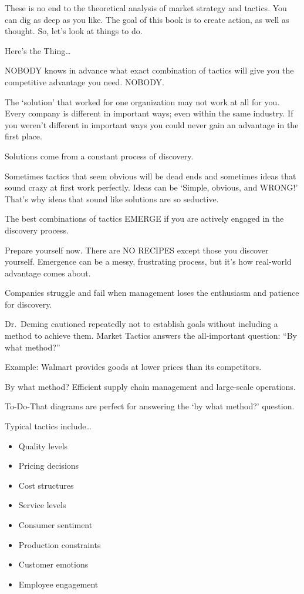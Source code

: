 \documentclass[
]{book}
\providecommand{\tightlist}{%
  \setlength{\itemsep}{0pt}\setlength{\parskip}{0pt}}
\begin{document}
These is no end to the theoretical analysis of market strategy and tactics. You can dig as deep as you like. The goal of this book is to create action, as well as thought. So, let's look at things to do.

Here's the Thing\ldots{}

{NOBODY} knows in advance what exact combination of tactics will give you the competitive advantage you need. {NOBODY.}

The `solution' that worked for one organization may not work at all for you. Every company is different in important ways; even within the same industry. If you weren't different in important ways you could never gain an advantage in the first place.

Solutions come from a constant process of discovery.

Sometimes tactics that seem obvious will be dead ends and sometimes ideas that sound crazy at first work perfectly. Ideas can be `Simple, obvious, and WRONG!' That's why ideas that sound like solutions are so seductive.

The best combinations of tactics EMERGE if you are actively engaged in the discovery process.

Prepare yourself now. There are NO RECIPES except those you discover yourself. Emergence can be a messy, frustrating process, but it's how real-world advantage comes about.

Companies struggle and fail when management loses the enthusiasm and patience for discovery.

Dr.~Deming cautioned repeatedly not to establish goals without including a method to achieve them. Market Tactics answers the all-important question: ``By what method?''

{Example:} Walmart provides goods at lower prices than its competitors.

{By what method?} Efficient supply chain management and large-scale operations.

To-Do-That diagrams are perfect for answering the `by what method?' question.

Typical tactics include\ldots{}

\begin{itemize}
\tightlist
\item
  Quality levels
\item
  Pricing decisions
\item
  Cost structures
\item
  Service levels
\item
  Consumer sentiment
\item
  Production constraints
\item
  Customer emotions
\item
  Employee engagement
\end{itemize}
\end{document}
